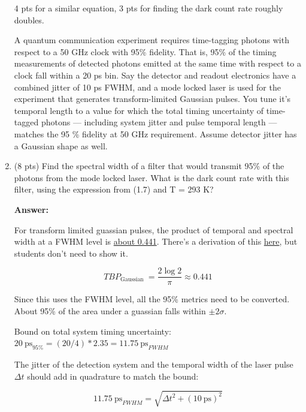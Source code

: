 \documentclass[11pt]{caltech_thesis} %
\begin{document}
\begin{enumerate}
  {\color{darkred} 4 pts for a similar equation, 3 pts for finding the
  dark count rate roughly doubles. }

  A quantum communication experiment requires time-tagging photons with
  respect to a 50 GHz clock with 95\% fidelity. That is, 95\% of the
  timing measurements of detected photons emitted at the same time with
  respect to a clock fall within a 20 ps bin. Say the detector and
  readout electronics have a combined jitter of 10 ps FWHM, and a mode
  locked laser is used for the experiment that generates
  transform-limited Gaussian pulses. You tune it's temporal length to a
  value for which the total timing uncertainty of time-tagged photons
  --- including system jitter and pulse temporal length --- matches the
  95 \% fidelity at 50 GHz requirement. Assume detector jitter has a
  Gaussian shape as well.
\item
  (8 pts) Find the spectral width of a filter that would transmit 95\%
  of the photons from the mode locked laser. What is the dark count rate
  with this filter, using the expression from (1.7) and T = 293 K?

  {\color{midnightblue}  \textbf{Answer:} }

  {\color{midnightblue} For transform limited guassian pulses, the
  product of temporal and spectral width at a FWHM level is
  \href{https://www.lasercalculator.com/transform-limited-pulse-calculator/}{about
  0.441}. There's a derivation of this
  \href{https://www.physicsforums.com/threads/time-bandwidth-product-ideal-mode-locking.171404/post-1339948}{here},
  but students don't need to show it. }

  {\color{midnightblue} 

  \[T B P_{\text {Gaussian }}=\frac{2 \log 2}{\pi} \approx 0.441\]

  }

  {\color{midnightblue}  Since this uses the FWHM level, all the 95\%
  metrics need to be converted. About 95\% of the area under a guassian
  falls within \(\pm 2 \sigma\). }

  {\color{midnightblue}  Bound on total system timing uncertainty:
  \(20~\text{ps}_{95\%} = (20/4)*2.35 = 11.75~\text{ps}_{FWHM}\) }

  {\color{midnightblue}  The jitter of the detection system and the
  temporal width of the laser pulse \(\Delta t\) should add in
  quadrature to match the bound: }

  {\color{midnightblue} 

  \[ 11.75~\text{ps}_{FWHM} = \sqrt{ \Delta t^2 + (10~\text{ps})^2}\]

}
\end{enumerate}
\end{document}
